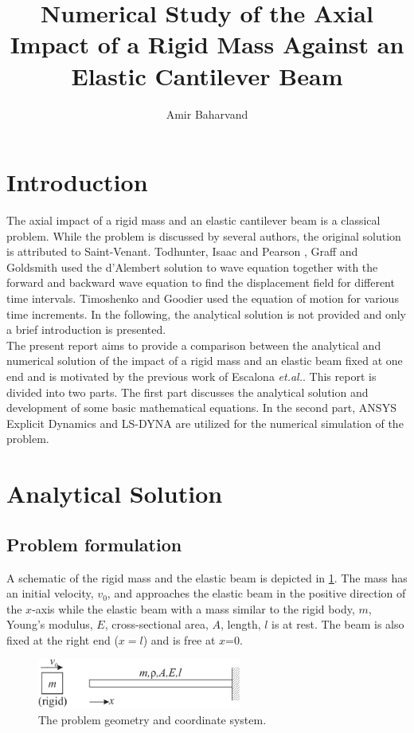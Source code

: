 \documentclass{article}
\title{Numerical Study of the Axial Impact of a Rigid Mass Against an Elastic Cantilever Beam}
\author{Amir Baharvand }
\date{}
\begin{document}
\maketitle

\section{Introduction}
The axial impact of a rigid mass and an elastic cantilever beam is a classical problem. While the problem is discussed by several authors, the original solution is attributed to Saint-Venant. Todhunter, Isaac and Pearson \cite{Todhunter1893}, Graff \cite{graff1975} and Goldsmith \cite{goldsmith2001} used the d'Alembert solution to wave equation together with the forward and backward wave equation to find the displacement field for different time intervals. Timoshenko and Goodier \cite{timoshenko1970} used the equation of motion for various time increments. In the following, the analytical solution is not provided and only a brief introduction is presented. \\

The present report aims to provide a comparison between the analytical and numerical solution of the impact of a rigid mass and an elastic beam fixed at one end and is motivated by the previous work of Escalona \emph{et.al.}\cite{Escalona1999}. This report is divided into two parts. The first part discusses the analytical solution and development of some basic mathematical equations. In the second part, ANSYS Explicit Dynamics and LS-DYNA are utilized for the numerical simulation of the problem. \\

\section{Analytical Solution}
\subsection{Problem formulation}
A schematic of the rigid mass and the elastic beam is depicted in \cref{fig:problem_formulation}. The mass has an initial velocity, $v_0$, and approaches the elastic beam in the positive direction of the $x$-axis while the elastic beam with a mass similar to the rigid body, $m$, Young's modulus, $E$, cross-sectional area, $A$, length, $l$ is at rest. The beam is also fixed at the right end ($x=l$) and is free at $x$=0.

\begin{figure}[H]
    \centering
    \includegraphics[width = 0.6\textwidth ]{figures/problem.pdf}
    \caption{The problem geometry and coordinate system.}
    \label{fig:problem_formulation}
\end{figure}
\end{document}
